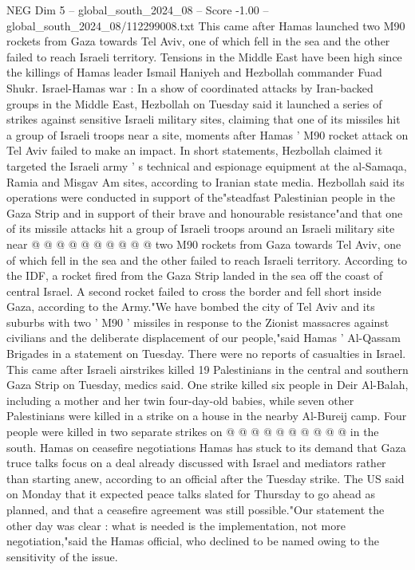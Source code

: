 \begin{textsample}{NEG Dim 5 – global\_south\_2024\_08 – Score -1.00 – global\_south\_2024\_08/112299008.txt}  \label{ex:f5_neg_173}
This came after Hamas launched two M90 rockets from Gaza towards Tel Aviv, one of which fell in the sea and the other failed to reach Israeli territory.
Tensions in the Middle East have been high since the killings of Hamas leader Ismail Haniyeh and Hezbollah commander Fuad Shukr.
Israel-Hamas war : In a show of coordinated attacks by Iran-backed groups in the Middle East, Hezbollah on Tuesday said it launched a series of strikes against sensitive Israeli military sites, claiming that one of its missiles hit a group of Israeli troops near a site, moments after Hamas ' M90 rocket attack on Tel Aviv failed to make an impact.
In short statements, Hezbollah claimed it targeted the Israeli army ' s technical and espionage equipment at the al-Samaqa, Ramia and Misgav Am sites, according to Iranian state media.
Hezbollah said its operations were conducted in support of the"steadfast Palestinian people in the Gaza Strip and in support of their brave and honourable resistance"and that one of its missile attacks hit a group of Israeli troops around an Israeli military site near @ @ @ @ @ @ @ @ @ @ two M90 rockets from Gaza towards Tel Aviv, one of which fell in the sea and the other failed to reach Israeli territory.
According to the IDF, a rocket fired from the Gaza Strip landed in the sea off the coast of central Israel.
A second rocket failed to cross the border and fell short inside Gaza, according to the Army."We have bombed the city of Tel Aviv and its suburbs with two ' M90 ' missiles in response to the Zionist massacres against civilians and the deliberate displacement of our people,"said Hamas ' Al-Qassam Brigades in a statement on Tuesday.
There were no reports of casualties in Israel.
This came after Israeli airstrikes killed 19 Palestinians in the central and southern Gaza Strip on Tuesday, medics said.
One strike killed six people in Deir Al-Balah, including a mother and her twin four-day-old babies, while seven other Palestinians were killed in a strike on a house in the nearby Al-Bureij camp.
Four people were killed in two separate strikes on @ @ @ @ @ @ @ @ @ @ in the south.
Hamas on ceasefire negotiations Hamas has stuck to its demand that Gaza truce talks focus on a deal already discussed with Israel and mediators rather than starting anew, according to an official after the Tuesday strike.
The US said on Monday that it expected peace talks slated for Thursday to go ahead as planned, and that a ceasefire agreement was still possible."Our statement the other day was clear : what is needed is the implementation, not more negotiation,"said the Hamas official, who declined to be named owing to the sensitivity of the issue.

\end{textsample}
